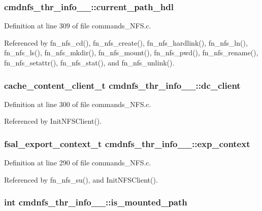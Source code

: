 \subsubsection{ {\bf cmdnfs\_\-thr\_\-info\_\-\_\-::current\_\-path\_\-hdl}}\label{structcmdnfs__thr__info_____o9}




Definition at line 309 of file commands\_\-NFS.c.

Referenced by fn\_\-nfs\_\-cd(), fn\_\-nfs\_\-create(), fn\_\-nfs\_\-hardlink(), fn\_\-nfs\_\-ln(), fn\_\-nfs\_\-ls(), fn\_\-nfs\_\-mkdir(), fn\_\-nfs\_\-mount(), fn\_\-nfs\_\-pwd(), fn\_\-nfs\_\-rename(), fn\_\-nfs\_\-setattr(), fn\_\-nfs\_\-stat(), and fn\_\-nfs\_\-unlink().
\subsubsection{\setlength{\rightskip}{0pt plus 5cm}cache\_\-content\_\-client\_\-t {\bf cmdnfs\_\-thr\_\-info\_\-\_\-::dc\_\-client}}\label{structcmdnfs__thr__info_____o5}




Definition at line 300 of file commands\_\-NFS.c.

Referenced by Init\-NFSClient().
\subsubsection{\setlength{\rightskip}{0pt plus 5cm}fsal\_\-export\_\-context\_\-t {\bf cmdnfs\_\-thr\_\-info\_\-\_\-::exp\_\-context}}\label{structcmdnfs__thr__info_____o1}




Definition at line 290 of file commands\_\-NFS.c.

Referenced by fn\_\-nfs\_\-su(), and Init\-NFSClient().
\subsubsection{\setlength{\rightskip}{0pt plus 5cm}int {\bf cmdnfs\_\-thr\_\-info\_\-\_\-::is\_\-mounted\_\-path}}\label{structcmdnfs__thr__info_____o6}




